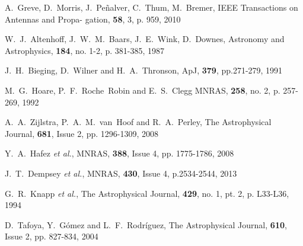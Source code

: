 \begin{thebibliography}{99}
 A.~Greve, D.~Morris, J.~Pe\~nalver, C.~Thum, M.~Bremer, IEEE Transactions on Antennas and Propa-
 gation, {\bf 58}, 3, p. 959, 2010

  W.~J.~Altenhoff,  J.~W.~M.~Baars,  J.~E.~Wink, D.~Downes, 
  Astronomy and Astrophysics, {\bf 184}, no. 1-2, p. 381-385, 1987


  J.~H.~Bieging, D.~Wilner and  H.~A.~Thronson, ApJ, {\bf 379},
  pp.271-279, 1991

  M.~G.~Hoare, P.~F.~Roche~Robin and E.~S.~Clegg 
 MNRAS, {\bf 258}, no. 2, p. 257-269, 1992 

  A.~A.~Zijlstra,  P.~A.~M.~van~Hoof and R.~A.~Perley,
  The Astrophysical Journal, {\bf 681}, Issue 2, pp. 1296-1309, 2008
  
  Y.~A.~Hafez {\it et al.}, 
  MNRAS, {\bf 388}, Issue 4, pp. 1775-1786, 2008

  J.~T.~Dempsey {\it et al.},  
  MNRAS, {\bf 430}, Issue 4, p.2534-2544, 2013

  G.~R.~Knapp {\it et al.},  
The Astrophysical Journal, {\bf 429}, no. 1, pt. 2, p. L33-L36, 1994

  D.~Tafoya, Y.~G\'omez and  L.~F.~Rodr\'iguez, 	
The Astrophysical Journal, {\bf 610}, Issue 2, pp. 827-834, 2004


\end{thebibliography}
